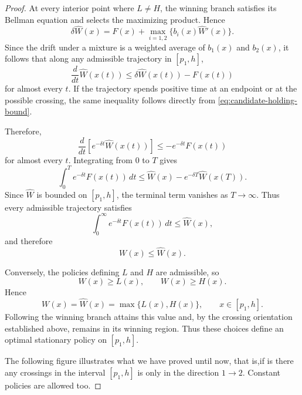 \documentclass[11pt]{article}
\begin{document}
\begin{proof}
At every interior point where $L\neq H$, the winning branch satisfies its Bellman equation and selects the maximizing product. Hence
\begin{equation*}
    \delta\widehat W(x)
    =
    F(x)+\max_{i=1,2}\{b_i(x)\widehat W'(x)\}.
\end{equation*}
Since the drift under a mixture is a weighted average of $b_1(x)$ and $b_2(x)$, it follows that along any admissible trajectory in $[p_1,h]$,
\begin{equation*}
    \frac{d}{dt}\widehat W(x(t))
    \leq
    \delta\widehat W(x(t))-F(x(t))
\end{equation*}
for almost every $t$. If the trajectory spends positive time at an endpoint or at the possible crossing, the same inequality follows directly from
\eqref{eq:candidate-holding-bound}.

Therefore,
\begin{equation*}
    \frac{d}{dt}
    \left[e^{-\delta t}\widehat W(x(t))\right]
    \leq
    -e^{-\delta t}F(x(t))
\end{equation*}
for almost every $t$. Integrating from $0$ to $T$ gives
\begin{equation*}
    \int_0^T e^{-\delta t}F(x(t))\,dt
    \leq
    \widehat W(x)-e^{-\delta T}\widehat W(x(T)).
\end{equation*}
Since $\widehat W$ is bounded on $[p_1,h]$, the terminal term vanishes as $T\to\infty$. Thus every admissible trajectory satisfies
\begin{equation*}
    \int_0^\infty e^{-\delta t}F(x(t))\,dt
    \leq
    \widehat W(x),
\end{equation*}
and therefore
\begin{equation*}
    W(x)\leq\widehat W(x).
\end{equation*}

Conversely, the policies defining $L$ and $H$ are admissible, so
\begin{equation*}
    W(x)\geq L(x),
    \qquad
    W(x)\geq H(x).
\end{equation*}
Hence
\begin{equation*}
    W(x)=\widehat W(x)=\max\{L(x),H(x)\},
    \qquad x\in[p_1,h].
\end{equation*}
Following the winning branch attains this value and, by the crossing orientation established above, remains in its winning region. Thus these choices define an optimal stationary policy on $[p_1,h]$.

The following figure illustrates what we have proved until now, that is,if is there any crossings in the interval $[p_1,h]$ is only in the direction $1 \rightarrow 2$. Constant policies are allowed too.


\end{proof}
\end{document}
